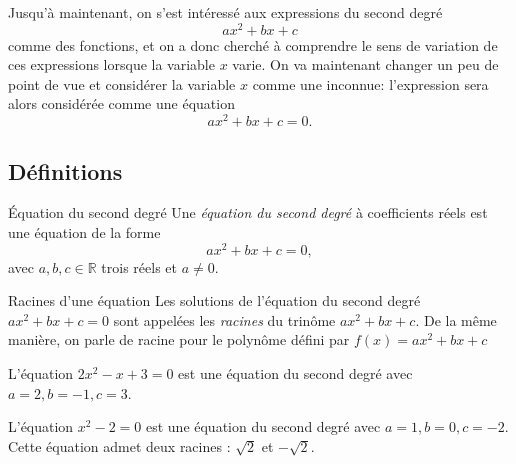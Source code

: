 \documentclass[11pt]{article}
\begin{document}
Jusqu'à maintenant, on s'est intéressé aux expressions du second degré
\[
  ax^2+bx+c
\]
comme des fonctions, et on a donc cherché à comprendre le sens de variation de
ces expressions lorsque la variable $x$ varie. On va maintenant changer un peu
de point de vue et considérer la variable $x$ comme une inconnue: l'expression
sera alors considérée comme une équation
\[
  ax^2+bx+c = 0.
\]

\subsection{Définitions} 
\begin{defi}{Équation du second degré}
  Une \emph{équation du second degré} à coefficients réels est une équation de
  la forme
  \[
    ax^2+bx+c = 0,
  \]
  avec $a,b,c\in\mathbb{R}$ trois réels et $a\neq0$.
\end{defi}

\begin{defi}{Racines d'une équation}
  Les solutions de l'équation du second degré $ax^2+bx+c=0$ sont appelées les
  \emph{racines} du trinôme $ax^2+bx+c$. De la même manière, on parle de racine
  pour le polynôme défini par $f(x)=ax^2+bx+c$
\end{defi}


\begin{exemple}
  L'équation $2x^2-x+3=0$ est une équation du second degré avec $a=2, b=-1, c=3$.
\end{exemple}

\begin{exemple}
  L'équation $x^2-2=0$ est une équation du second degré avec $a=1, b=0, c=-2$.
  Cette équation admet deux racines : $\sqrt 2$ et $-\sqrt 2$.
\end{exemple}
\end{document}
